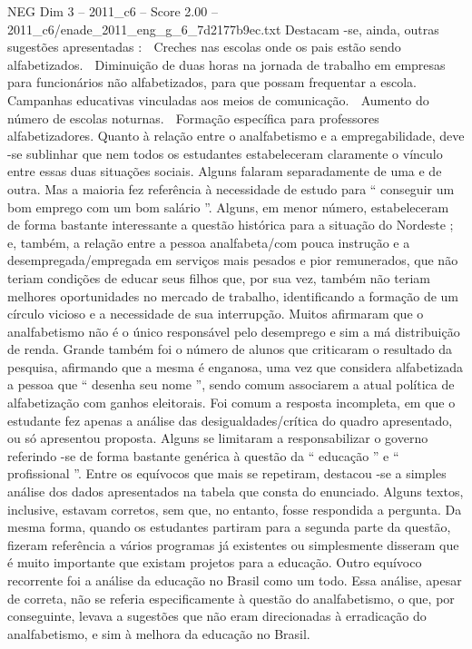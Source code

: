 \begin{textsample}{NEG Dim 3 – 2011\_c6 – Score 2.00 – 2011\_c6/enade\_2011\_eng\_g\_6\_7d2177b9ec.txt}
Destacam -se, ainda, outras sugestões apresentadas :  Creches nas escolas onde os pais estão sendo alfabetizados.  Diminuição de duas horas na jornada de trabalho em empresas para funcionários não alfabetizados, para que possam frequentar a escola.  Campanhas educativas vinculadas aos meios de comunicação.  Aumento do número de escolas noturnas.  Formação específica para professores alfabetizadores.
Quanto à relação entre o analfabetismo e a empregabilidade, deve -se sublinhar que nem todos os estudantes estabeleceram claramente o vínculo entre essas duas situações sociais.
Alguns falaram separadamente de uma e de outra.
Mas a maioria fez referência à necessidade de estudo para “ conseguir um bom emprego com um bom salário ”.
Alguns, em menor número, estabeleceram de forma bastante interessante a questão histórica para a situação do Nordeste ; e, também, a relação entre a pessoa analfabeta/com pouca instrução e a desempregada/empregada em serviços mais pesados e pior remunerados, que não teriam condições de educar seus filhos que, por sua vez, também não teriam melhores oportunidades no mercado de trabalho, identificando a formação de um círculo vicioso e a necessidade de sua interrupção.
Muitos afirmaram que o analfabetismo não é o único responsável pelo desemprego e sim a má distribuição de renda.
Grande também foi o número de alunos que criticaram o resultado da pesquisa, afirmando que a mesma é enganosa, uma vez que considera alfabetizada a pessoa que “ desenha seu nome ”, sendo comum associarem a atual política de alfabetização com ganhos eleitorais.
Foi comum a resposta incompleta, em que o estudante fez apenas a análise das desigualdades/crítica do quadro apresentado, ou só apresentou proposta.
Alguns se limitaram a responsabilizar o governo referindo -se de forma bastante genérica à questão da “ educação ” e “ profissional ”.
Entre os equívocos que mais se repetiram, destacou -se a simples análise dos dados apresentados na tabela que consta do enunciado.
Alguns textos, inclusive, estavam corretos, sem que, no entanto, fosse respondida a pergunta.
Da mesma forma, quando os estudantes partiram para a segunda parte da questão, fizeram referência a vários programas já existentes ou simplesmente disseram que é muito importante que existam projetos para a educação.
Outro equívoco recorrente foi a análise da educação no Brasil como um todo.
Essa análise, apesar de correta, não se referia especificamente à questão do analfabetismo, o que, por conseguinte, levava a sugestões que não eram direcionadas à erradicação do analfabetismo, e sim à melhora da educação no Brasil.

\end{textsample}
